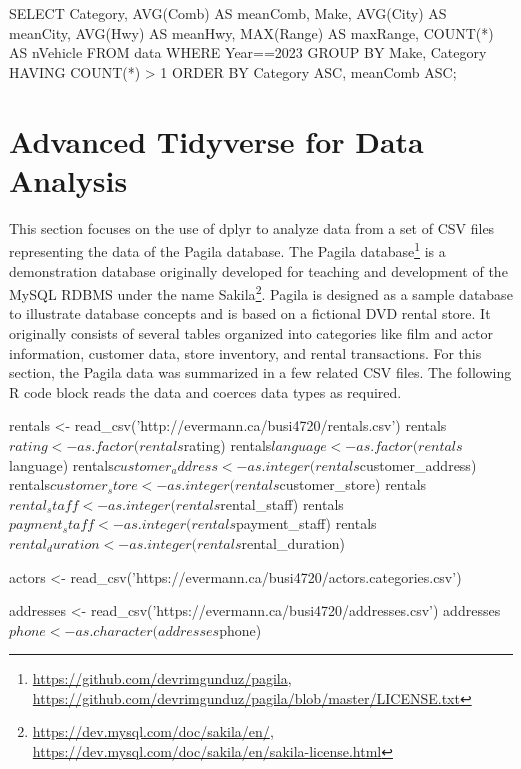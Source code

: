 \begin{sqlcode}
SELECT Category, 
       AVG(Comb) AS meanComb,
       Make,
       AVG(City) AS meanCity,
       AVG(Hwy) AS meanHwy,
       MAX(Range) AS maxRange,
       COUNT(*) AS nVehicle
   FROM data 
   WHERE Year==2023
   GROUP BY Make, Category
   HAVING COUNT(*) > 1
   ORDER BY Category ASC, meanComb ASC;
\end{sqlcode}

\section{Advanced Tidyverse for Data Analysis}

This section focuses on the use of dplyr to analyze data from a set of CSV files representing the data of the Pagila database. The Pagila database\footnote{\url{https://github.com/devrimgunduz/pagila}, \\
\url{https://github.com/devrimgunduz/pagila/blob/master/LICENSE.txt}} is a demonstration database originally developed for teaching and development of the MySQL RDBMS under the name Sakila\footnote{\url{https://dev.mysql.com/doc/sakila/en/}, \\
\url{https://dev.mysql.com/doc/sakila/en/sakila-license.html}}. Pagila is designed as a sample database to illustrate database concepts and is based on a fictional DVD rental store. It originally consists of several tables organized into categories like film and actor information, customer data, store inventory, and rental transactions. For this section, the Pagila data was summarized in a few related CSV files. The following R code block reads the data and coerces data types as required.

\begin{Rcode}
rentals <- read_csv('http://evermann.ca/busi4720/rentals.csv')
rentals$rating <- as.factor(rentals$rating)
rentals$language <- as.factor(rentals$language)
rentals$customer_address <- as.integer(rentals$customer_address)
rentals$customer_store <- as.integer(rentals$customer_store)
rentals$rental_staff <- as.integer(rentals$rental_staff)
rentals$payment_staff <- as.integer(rentals$payment_staff)
rentals$rental_duration <- as.integer(rentals$rental_duration)

actors <- 
  read_csv('https://evermann.ca/busi4720/actors.categories.csv')
  
addresses <- read_csv('https://evermann.ca/busi4720/addresses.csv')
addresses$phone <- as.character(addresses$phone)
\end{Rcode}

